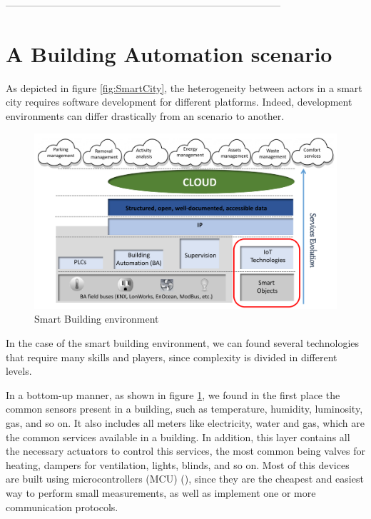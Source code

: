 -----------------------------------------------------------------------------------

\section{A Building Automation scenario}
\label{sec:BAScenario}
As depicted in figure \ref{fig:SmartCity}, the heterogeneity between actors in a smart city requires software development for different platforms.
Indeed, development environments can differ drastically from an scenario to another.

\begin{figure}[htb]
	\centering
	\includegraphics[width=1\columnwidth]{chapters/background.images/SmartServices.pdf}
	\caption{Smart Building environment}
	\label{fig:SmartServices}
\end{figure}

In the case of the smart building environment, we can found several technologies that require many skills and players, since complexity is divided in different levels.

In a bottom-up manner, as shown in figure \ref{fig:SmartServices}, we found in the first place the common sensors present in a building, such as temperature, humidity, luminosity, gas, and so on. 
It also includes all meters like electricity, water and gas, which are the common services available in a building.
In addition, this layer contains all the necessary actuators to control this services, the most common being valves for heating, dampers for ventilation, lights, blinds, and so on.
Most of this devices are built using microcontrollers (MCU) (), since they are the cheapest and easiest way to perform small measurements, as well as implement one or more communication protocols.

